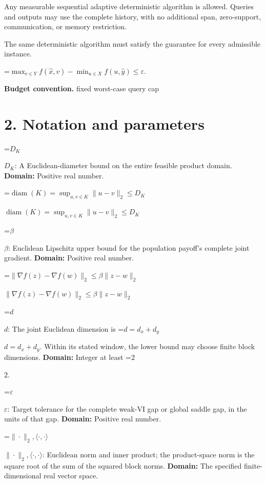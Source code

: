 \documentclass[10pt,a4paper]{article}
\newcommand{\AtlasMath}[1]{\par\begingroup\centering\setbox0=\hbox{$\displaystyle #1$}\ifdim\wd0>1.4\linewidth\typeout{ATLAS WIDE FORMULA: \the\wd0}\fi\ifdim\wd0>\linewidth\resizebox{\linewidth}{!}{\box0}\else\box0\fi\par\endgroup}
\newcommand{\AtlasInlineMath}[1]{\begingroup\setbox0=\hbox{$#1$}\ifdim\wd0>.4\linewidth\endgroup\AtlasMath{#1}\else\endgroup$#1$\fi}
\begin{document}
Any measurable sequential adaptive deterministic algorithm is allowed. Queries and outputs may use the complete history, with no additional span, zero-support, communication, or memory restriction.



The same deterministic algorithm must satisfy the guarantee for every admissible instance.




\AtlasMath{\max_{v\in Y}f(\widehat{x},v)-\min_{u\in X}f(u,\widehat{y})\le\varepsilon.}




\textbf{Budget convention.} fixed worst-case query cap



\section{2. Notation and parameters}


\AtlasInlineMath{D_K}: A Euclidean-diameter bound on the entire feasible product domain. \textbf{Domain:} Positive real number.



\AtlasInlineMath{\operatorname{diam}(K)=\sup_{u,v\in K}\|u-v\|_2\le D_K}



\AtlasInlineMath{\beta}: Euclidean Lipschitz upper bound for the population payoff's complete joint gradient. \textbf{Domain:} Positive real number.



\AtlasInlineMath{\|\nabla f(z)-\nabla f(w)\|_2\le\beta\|z-w\|_2}



\AtlasInlineMath{d}: The joint Euclidean dimension is \AtlasInlineMath{d=d_x+d_y}. Within its stated window, the lower bound may choose finite block dimensions. \textbf{Domain:} Integer at least \AtlasInlineMath{2}.



\AtlasInlineMath{\varepsilon}: Target tolerance for the complete weak-VI gap or global saddle gap, in the units of that gap. \textbf{Domain:} Positive real number.



\AtlasInlineMath{\|\cdot\|_2,\langle\cdot,\cdot\rangle}: Euclidean norm and inner product; the product-space norm is the square root of the sum of the squared block norms. \textbf{Domain:} The specified finite-dimensional real vector space.
\end{document}
